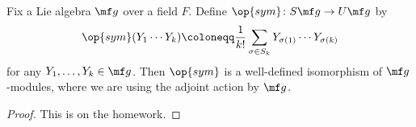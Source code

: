 \documentclass[../notes.tex]{subfiles}
\begin{document}
\begin{proposition} \label{prop:sg-is-ug}
	Fix a Lie algebra $\mf g$ over a field $F$. Define $\op{sym}\colon S\mf g\to U\mf g$ by
	\[\op{sym}(Y_1\cdots Y_k)\coloneqq\frac1{k!}\sum_{\sigma\in S_k}Y_{\sigma(1)}\cdots Y_{\sigma(k)}\]
	for any $Y_1,\ldots,Y_k\in\mf g$. Then $\op{sym}$ is a well-defined isomorphism of $\mf g$-modules, where we are using the adjoint action by $\mf g$.
\end{proposition}
\begin{proof}
	This is on the homework.

\end{proof}
\end{document}
